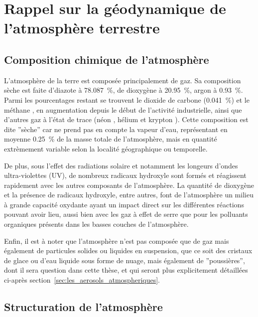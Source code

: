 
\section{Rappel sur la géodynamique de l'atmosphère terrestre}%
\label{sec:structure_atmosphere}

\subsection{Composition chimique de l'atmosphère}%
\label{ssub:composition_chimique_de_latmosphere}

L'atmosphère de la terre est composée principalement de gaz. Sa composition sèche est
faite d'diazote  à \SI{78.087}{\percent}, de dioxygène  à
\SI{20.95}{\percent}, argon  à \SI{0.93}{\percent}. Parmi les pourcentages restant
se trouvent le dioxide de carbone  (\SI{0.041}{\percent}) et le méthane ,
en augmentation depuis le début de l'activité industrielle, ainsi que d'autres gaz à
l'état de trace (néon , hélium  et krypton ).  Cette composition est
dite ''sèche'' car ne prend pas en compte la vapeur d'eau, représentant en moyenne 
\SI{0.25}{\percent} de la masse totale de l'atmosphère, mais en quantité extrèmement
variable selon la localité géographique ou temporelle.

De plus, sous l'effet des radiations solaire et notamment les longeurs d'ondes
ultra-violettes (UV), de nombreux radicaux hydroxyle  sont formés et réagissent
rapidement avec les autres composants de l'atmosphère.  La quantité de dioxygène et la
présence de radicaux hydroxyle, entre autres, font de l'atmosphère un milieu à grande
capacité oxydante ayant un impact direct sur les différentes réactions pouvant avoir lieu,
aussi bien avec les gaz à effet de serre que pour les polluants organiques présents dans
les basses couches de l'atmosphère.

Enfin, il est à noter que l'atmosphère n'est pas composée que de gaz mais également de
particules solides ou liquides en suspension, que ce soit des cristaux de glace ou d'eau
liquide sous forme de nuage, mais également de ''poussières'', dont il sera question dans
cette thèse, et qui seront plus explicitement détaillées ci-après
section~\ref{sec:les_aerosols_atmospheriques}.

\subsection{Structuration de l'atmosphère}%
\label{sub:structuration_de_l_atmosphere}

